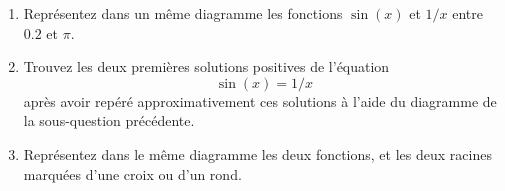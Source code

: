 \begin{exercice}\label{exoMatlab0020}

\begin{enumerate}
\item Représentez dans un même diagramme les fonctions $\sin(x)$ et $1/x$ entre $0.2$ et $\pi$.
\item Trouvez les deux premières solutions positives de l'équation
\[ \sin(x) = 1/x \]
après avoir repéré approximativement ces solutions à l'aide du diagramme de la sous-question précédente.
\item Représentez dans le même diagramme les deux fonctions, et les deux racines marquées d'une croix ou d'un rond.
\end{enumerate}

\end{exercice}
